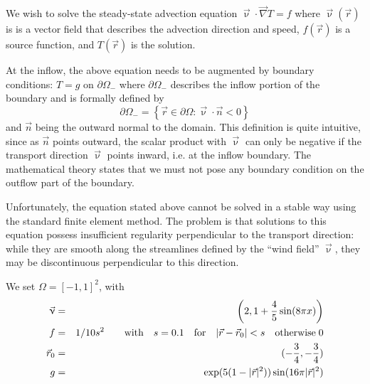 We wish to solve the steady-state advection equation 
$\vec\upnu \cdot \vec\nabla T = f$ 
where $\vec\upnu(\vec r)$ is  is a vector field that describes the advection direction and speed,
$f(\vec r)$ is a source function, and $T(\vec r)$ is the solution. 

At the inflow, the above equation needs to be augmented by boundary conditions: 
$T=g$ on $\partial\Omega_-$ where $\partial\Omega_-$ describes the inflow portion 
of the boundary and is formally defined by
\[
\partial\Omega_- = \left\{  \vec{r} \in \partial\Omega : \vec{\upnu}\cdot\vec{n} <0  \right\}
\]
and $\vec{n}$ being the outward normal to the domain. This definition is quite intuitive, 
since as $\vec{n}$ points outward, the scalar product with $\vec{\upnu}$ can only be negative if the transport direction $\vec{\upnu}$ points inward, i.e. at the inflow boundary. The mathematical theory states that we must not pose any boundary condition on the outflow part of the boundary.

Unfortunately, the equation stated above cannot be solved in a stable way using the standard finite element method. The problem is that solutions to this equation possess insufficient regularity perpendicular to the transport direction: while they are smooth along the streamlines defined by the ``wind field'' $\vec{\upnu}$, they may be discontinuous perpendicular to this direction.

We set $\Omega=[-1,1]^2$, with 
\begin{eqnarray}
\vec{\upnu} &=& \left(2, 1+\frac45\sin(8\pi x) \right) \nonumber\\
f&=&1/10s^2 \qquad \text{with} \quad s=0.1 \quad \text{for} \quad |\vec{r}-\vec{r}_0|<s \quad \text{otherwise}\; 0\nonumber\\ 
\vec{r}_0 &=& (-\frac34,-\frac34) \nonumber\\
g&=&\exp(5(1-|\vec{r}|^2))\sin(16\pi |\vec{r}|^2)
\end{eqnarray}

